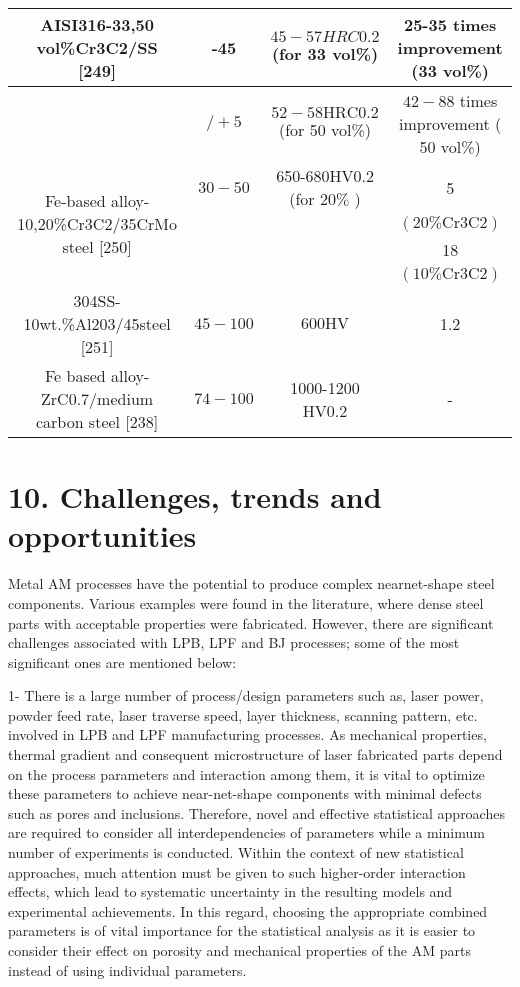 \documentclass[10pt]{article}
\begin{document}
\begin{center}
\begin{tabular}{|c|c|c|c|}
\hline
\multirow[t]{2}{*}{AISI316-33,50 vol\%Cr3C2/SS [249]} & -45 & $45-57 H R C 0.2$ (for 33 vol\%) & 25-35 times improvement (33 vol\%) \\
\hline
 & $/+5$ & $52-58 \mathrm{HRC} 0.2$ (for 50 vol\%) & $42-88$ times improvement ( 50 vol\%) \\
\hline
\multirow[t]{4}{*}{Fe-based alloy-10,20\%Cr3C2/35CrMo steel [250]} & $30-50$ & 650-680HV0.2 (for $20 \%$ ) & 5 \\
\hline
 &  &  & $(20 \% \mathrm{Cr} 3 \mathrm{C} 2)$ \\
\hline
 &  &  & 18 \\
\hline
 &  &  & $(10 \% \mathrm{Cr} 3 \mathrm{C} 2)$ \\
\hline
304SS-10wt.\%Al203/45steel [251] & $45-100$ & $600 \mathrm{HV}$ & 1.2 \\
\hline
Fe based alloy-ZrC0.7/medium carbon steel [238] & $74-100$ & 1000-1200 HV0.2 & - \\
\hline
\end{tabular}
\end{center}

\section*{10. Challenges, trends and opportunities}
Metal AM processes have the potential to produce complex nearnet-shape steel components. Various examples were found in the literature, where dense steel parts with acceptable properties were fabricated. However, there are significant challenges associated with LPB, LPF and BJ processes; some of the most significant ones are mentioned below:

1- There is a large number of process/design parameters such as, laser power, powder feed rate, laser traverse speed, layer thickness, scanning pattern, etc. involved in LPB and LPF manufacturing processes. As mechanical properties, thermal gradient and consequent microstructure of laser fabricated parts depend on the process parameters and interaction among them, it is vital to optimize these parameters to achieve near-net-shape components with minimal defects such as pores and inclusions. Therefore, novel and effective statistical approaches are required to consider all interdependencies of parameters while a minimum number of experiments is conducted. Within the context of new statistical approaches, much attention must be given to such higher-order interaction effects, which lead to systematic uncertainty in the resulting models and experimental achievements. In this regard, choosing the appropriate combined parameters is of vital importance for the statistical analysis as it is easier to consider their effect on porosity and mechanical properties of the AM parts instead of using individual parameters.
\end{document}
